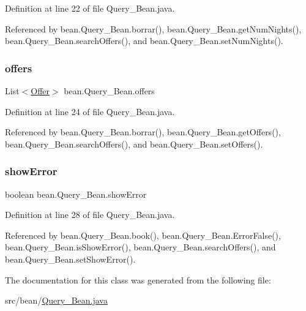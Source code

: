 Definition at line 22 of file Query\+\_\+\+Bean.\+java.



Referenced by bean.\+Query\+\_\+\+Bean.\+borrar(), bean.\+Query\+\_\+\+Bean.\+get\+Num\+Nights(), bean.\+Query\+\_\+\+Bean.\+search\+Offers(), and bean.\+Query\+\_\+\+Bean.\+set\+Num\+Nights().

\mbox{\label{classbean_1_1Query__Bean_ab994c486fce1a6f2f3fa9a7b333187ba}} 
\subsubsection{\texorpdfstring{offers}{offers}}
{\footnotesize\ttfamily List$<$\mbox{\hyperlink{classdomain_1_1Offer}{Offer}}$>$ bean.\+Query\+\_\+\+Bean.\+offers\hspace{0.3cm}{\ttfamily [package]}}



Definition at line 24 of file Query\+\_\+\+Bean.\+java.



Referenced by bean.\+Query\+\_\+\+Bean.\+borrar(), bean.\+Query\+\_\+\+Bean.\+get\+Offers(), bean.\+Query\+\_\+\+Bean.\+search\+Offers(), and bean.\+Query\+\_\+\+Bean.\+set\+Offers().

\mbox{\label{classbean_1_1Query__Bean_a7334f280df18d4e790c5a086b8334a0f}} 
\subsubsection{\texorpdfstring{showError}{showError}}
{\footnotesize\ttfamily boolean bean.\+Query\+\_\+\+Bean.\+show\+Error\hspace{0.3cm}{\ttfamily [package]}}



Definition at line 28 of file Query\+\_\+\+Bean.\+java.



Referenced by bean.\+Query\+\_\+\+Bean.\+book(), bean.\+Query\+\_\+\+Bean.\+Error\+False(), bean.\+Query\+\_\+\+Bean.\+is\+Show\+Error(), bean.\+Query\+\_\+\+Bean.\+search\+Offers(), and bean.\+Query\+\_\+\+Bean.\+set\+Show\+Error().



The documentation for this class was generated from the following file\+:\begin{DoxyCompactItemize}
\item 
src/bean/\mbox{\hyperlink{Query__Bean_8java}{Query\+\_\+\+Bean.\+java}}\end{DoxyCompactItemize}
